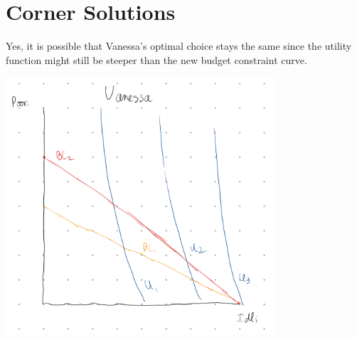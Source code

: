 \documentclass[8pt]{extarticle}
\begin{document}
{\section{Corner Solutions}
Yes, it is possible that Vanessa's optimal choice stays the same since the utility function might still be steeper than the new budget constraint curve.
\begin{center}
	\includegraphics[width=10cm]{HW3Q11}
\end{center}
}
\end{document}
